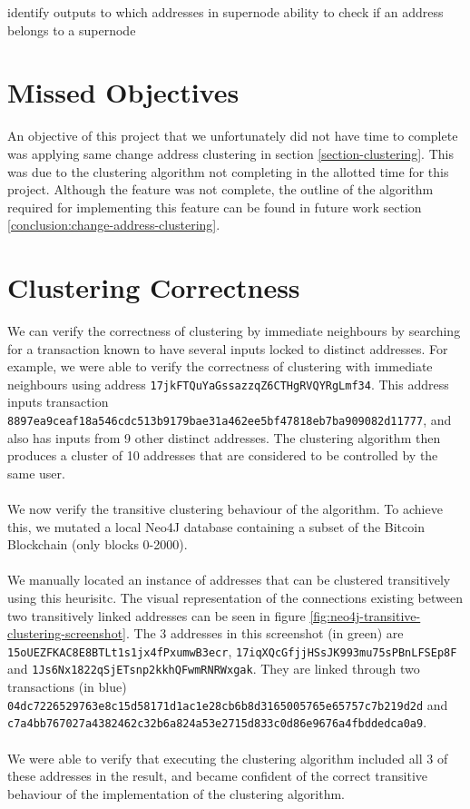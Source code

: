 identify outputs to which addresses in supernode
ability to check if an address belongs to a supernode 


\section{Missed Objectives}
An objective of this project that we unfortunately did not have time to complete was applying same change address clustering in section \ref{section-clustering}. This was due to the clustering algorithm not completing in the allotted time for this project. Although the feature was not complete, the outline of the algorithm required for implementing this feature can be found in future work section \ref{conclusion:change-address-clustering}. 



\section{Clustering Correctness}
We can verify the correctness of clustering by immediate neighbours by searching for a transaction known to have several inputs locked to distinct addresses. For example, we were able to verify the correctness of clustering with immediate neighbours using address \texttt{17jkFTQuYaGssazzqZ6CTHgRVQYRgLmf34}. This address inputs transaction \\\texttt{8897ea9ceaf18a546cdc513b9179bae31a462ee5bf47818eb7ba909082d11777}, and also has inputs from 9 other distinct addresses. The clustering algorithm then produces a cluster of 10 addresses that are considered to be controlled by the same user. 
\\\\
We now verify the transitive clustering behaviour of the algorithm.  
To achieve this, we mutated a local Neo4J database containing a subset of the Bitcoin Blockchain (only blocks 0-2000). 
\\\\
We manually located an instance of addresses that can be clustered transitively using this heurisitc. The visual representation of the connections existing between two transitively linked addresses can be seen in figure \ref{fig:neo4j-transitive-clustering-screenshot}. The 3 addresses in this screenshot (in green) are \texttt{15oUEZFKAC8E8BTLt1s1jx4fPxumwB3ecr}, \texttt{17iqXQcGfjjHSsJK993mu75sPBnLFSEp8F} and \texttt{1Js6Nx1822qSjETsnp2kkhQFwmRNRWxgak}. They are linked through two transactions (in blue) \texttt{04dc7226529763e8c15d58171d1ac1e28cb6b8d3165005765e65757c7b219d2d} and \texttt{c7a4bb767027a4382462c32b6a824a53e2715d833c0d86e9676a4fbddedca0a9}. 
\\\\
We were able to verify that executing the clustering algorithm included all 3 of these addresses in the result, and became confident of the correct transitive behaviour of the implementation of the clustering algorithm. 

